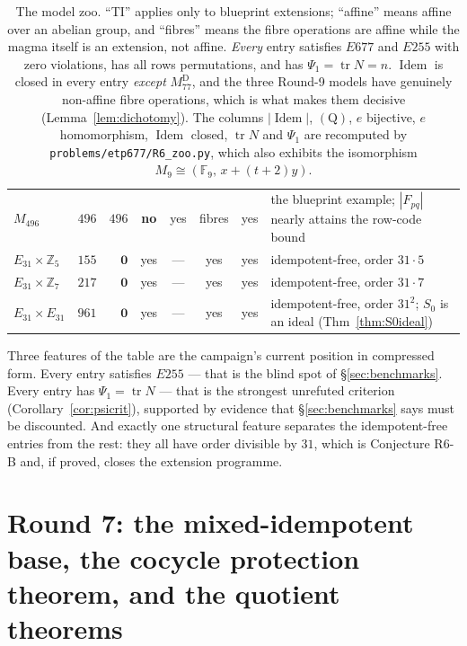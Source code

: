 \documentclass[11pt]{article}
\theoremstyle{plain}
\theoremstyle{definition}
\theoremstyle{remark}
\numberwithin{equation}{section}
\newcommand{\Z}{\mathbb{Z}}
\newcommand{\F}{\mathbb{F}}
\newcommand{\tr}{\operatorname{tr}}
\newcommand{\Idem}{\operatorname{Idem}}
\begin{document}
\begin{table}[htbp]
{\begin{tabular}{lrrcccc>{\raggedright\arraybackslash}p{}}
$M_{496}$ & $496$ & $496$ & \textbf{no} & yes & fibres & yes & the blueprint example; $|F_{pq}|$ nearly attains the row-code bound\\
$E_{31}\times\Z_5$ & $155$ & $\mathbf{0}$ & yes & --- & yes & yes & idempotent-free, order $31\cdot5$\\
$E_{31}\times\Z_7$ & $217$ & $\mathbf{0}$ & yes & --- & yes & yes & idempotent-free, order $31\cdot7$\\
$E_{31}\times E_{31}$ & $961$ & $\mathbf{0}$ & yes & --- & yes & yes & idempotent-free, order $31^2$; $S_0$ is an ideal (Thm~\ref{thm:S0ideal})\\
\bottomrule
\end{tabular}}
\caption{The model zoo. ``TI'' applies only to blueprint extensions; ``affine''
means affine over an abelian group, and ``fibres'' means the fibre operations are
affine while the magma itself is an extension, not affine. \emph{Every} entry
satisfies $E677$ and $E255$ with zero violations, has all rows permutations, and
has $\Psi_1 = \tr N = n$. $\Idem$ is closed in every entry \emph{except}
$M_{77}^{\mathrm{D}}$, and the three Round-9 models have genuinely non-affine
fibre operations, which is what makes them decisive
(Lemma~\ref{lem:dichotomy}). The columns
$|\Idem|$, $(\mathrm{Q})$, $e$ bijective, $e$ homomorphism, $\Idem$ closed,
$\tr N$ and $\Psi_1$ are recomputed by
\texttt{problems/etp677/R6\_zoo.py}, which also exhibits the isomorphism
$M_9\cong(\F_9,\,x+(t+2)y)$.}
\label{tab:zoo}
\end{table}

Three features of the table are the campaign's current position in compressed
form. Every entry satisfies $E255$ --- that is the blind spot of
\S\ref{sec:benchmarks}. Every entry has $\Psi_1 = \tr N$ --- that is the strongest
unrefuted criterion (Corollary~\ref{cor:psicrit}), supported by evidence that
\S\ref{sec:benchmarks} says must be discounted. And exactly one structural feature
separates the idempotent-free entries from the rest: they all have order divisible
by $31$, which is Conjecture R6-B and, if proved, closes the extension programme.

\section{Round 7: the mixed-idempotent base, the cocycle protection theorem, and
the quotient theorems}\label{sec:round7}
\end{document}
